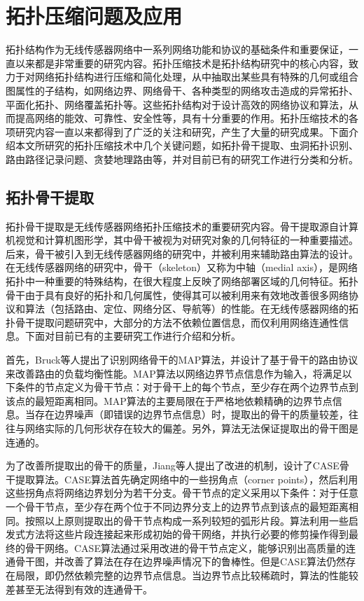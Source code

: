\section{拓扑压缩问题及应用}
拓扑结构作为无线传感器网络中一系列网络功能和协议的基础条件和重要保证，一直以来都是非常重要的研究内容。拓扑压缩技术是拓扑结构研究中的核心内容，致力于对网络拓扑结构进行压缩和简化处理，从中抽取出某些具有特殊的几何或组合图属性的子结构，如网络边界、网络骨干、各种类型的网络攻击造成的异常拓扑、平面化拓扑、网络覆盖拓扑等。这些拓扑结构对于设计高效的网络协议和算法，从而提高网络的能效、可靠性、安全性等，具有十分重要的作用。拓扑压缩技术的各项研究内容一直以来都得到了广泛的关注和研究，产生了大量的研究成果。下面介绍本文所研究的拓扑压缩技术中几个关键问题，如拓扑骨干提取、虫洞拓扑识别、路由路径记录问题、贪婪地理路由等，并对目前已有的研究工作进行分类和分析。
\subsection{拓扑骨干提取}
拓扑骨干提取是无线传感器网络拓扑压缩技术的重要研究内容。骨干提取源自计算机视觉和计算机图形学，其中骨干被视为对研究对象的几何特征的一种重要描述。后来，骨干被引入到无线传感器网络的研究中，并被利用来辅助路由算法的设计。在无线传感器网络的研究中，骨干（skeleton）又称为中轴（medial axis），是网络拓扑中一种重要的特殊结构，在很大程度上反映了网络部署区域的几何特征。拓扑骨干由于具有良好的拓扑和几何属性，使得其可以被利用来有效地改善很多网络协议和算法（包括路由、定位、网络分区、导航等）的性能。在无线传感器网络的拓扑骨干提取问题研究中，大部分的方法不依赖位置信息，而仅利用网络连通性信息。下面对目前已有的主要研究工作进行介绍和分析。

首先，Bruck等人提出了识别网络骨干的MAP算法，并设计了基于骨干的路由协议来改善路由的负载均衡性能。MAP算法以网络边界节点信息作为输入，将满足以下条件的节点定义为骨干节点：对于骨干上的每个节点，至少存在两个边界节点到该点的最短距离相同。MAP算法的主要局限在于严格地依赖精确的边界节点信息。当存在边界噪声（即错误的边界节点信息）时，提取出的骨干的质量较差，往往与网络实际的几何形状存在较大的偏差。另外，算法无法保证提取出的骨干图是连通的。

为了改善所提取出的骨干的质量，Jiang等人提出了改进的机制，设计了CASE骨干提取算法。CASE算法首先确定网络中的一些拐角点（corner points），然后利用这些拐角点将网络边界划分为若干分支。骨干节点的定义采用以下条件：对于任意一个骨干节点，至少存在两个位于不同边界分支上的边界节点到该点的最短距离相同。按照以上原则提取出的骨干节点构成一系列较短的弧形片段。算法利用一些启发式方法将这些片段连接起来形成初始的骨干网络，并执行必要的修剪操作得到最终的骨干网络。CASE算法通过采用改进的骨干节点定义，能够识别出高质量的连通骨干图，并改善了算法在存在边界噪声情况下的鲁棒性。但是CASE算法仍然存在局限，即仍然依赖完整的边界节点信息。当边界节点比较稀疏时，算法的性能较差甚至无法得到有效的连通骨干。

